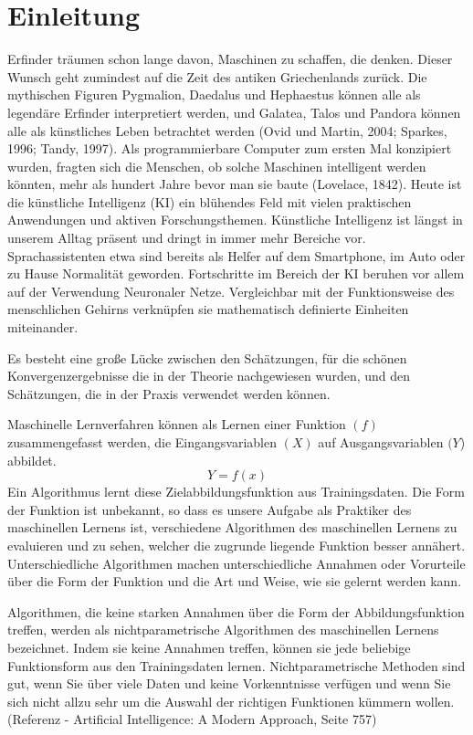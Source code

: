 \chapter*{Einleitung}

Erfinder träumen schon lange davon, Maschinen zu schaffen, die denken. Dieser Wunsch geht zumindest auf die Zeit des antiken Griechenlands zurück. Die mythischen Figuren Pygmalion, Daedalus und Hephaestus können alle als legendäre Erfinder interpretiert werden, und Galatea, Talos und Pandora können alle als künstliches Leben betrachtet werden (Ovid und Martin, 2004; Sparkes, 1996; Tandy, 1997).
Als programmierbare Computer zum ersten Mal konzipiert wurden, fragten sich die Menschen, ob solche Maschinen intelligent werden könnten, mehr als hundert Jahre bevor man sie baute (Lovelace, 1842). Heute ist die künstliche Intelligenz (KI) ein blühendes Feld mit vielen praktischen Anwendungen und aktiven Forschungsthemen. 
Künstliche Intelligenz ist längst in unserem Alltag präsent und dringt in immer mehr Bereiche vor. Sprachassistenten etwa sind bereits als Helfer auf dem Smartphone, im Auto oder zu Hause Normalität geworden. Fortschritte im Bereich der KI beruhen vor allem auf der Verwendung Neuronaler Netze. Vergleichbar mit der Funktionsweise des menschlichen Gehirns verknüpfen sie mathematisch definierte Einheiten miteinander.

Es besteht eine große Lücke zwischen den Schätzungen, für die schönen Konvergenzergebnisse die in der Theorie nachgewiesen wurden, und den Schätzungen, die in der Praxis verwendet werden können.

Maschinelle Lernverfahren können als Lernen einer Funktion $(f)$ zusammengefasst werden, die Eingangsvariablen $(X)$ auf Ausgangsvariablen $(Y$) abbildet.
$$Y = f(x)$$
Ein Algorithmus lernt diese Zielabbildungsfunktion aus Trainingsdaten.
Die Form der Funktion ist unbekannt, so dass es unsere Aufgabe als Praktiker des maschinellen Lernens ist, verschiedene Algorithmen des maschinellen Lernens zu evaluieren und zu sehen, welcher die zugrunde liegende Funktion besser annähert.
Unterschiedliche Algorithmen machen unterschiedliche Annahmen oder Vorurteile über die Form der Funktion und die Art und Weise, wie sie gelernt werden kann.

Algorithmen, die keine starken Annahmen über die Form der Abbildungsfunktion treffen, werden als nichtparametrische Algorithmen des maschinellen Lernens bezeichnet. Indem sie keine Annahmen treffen, können sie jede beliebige Funktionsform aus den Trainingsdaten lernen.
Nichtparametrische Methoden sind gut, wenn Sie über viele Daten und keine Vorkenntnisse verfügen und wenn Sie sich nicht allzu sehr um die Auswahl der richtigen Funktionen kümmern wollen. (Referenz - Artificial Intelligence: A Modern Approach, Seite 757)

